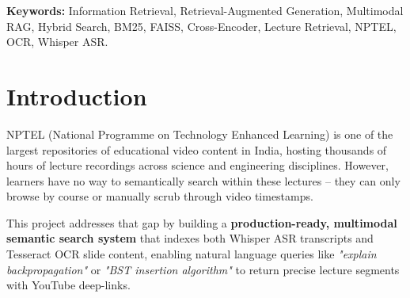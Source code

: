 \documentclass[12pt,a4paper]{article}
\begin{document}
\begin{abstract}
We present \textbf{VidyaRAG}, a multimodal semantic search system over NPTEL lecture transcripts and slide content. The system combines dense retrieval using BGE-large-en-v1.5 embeddings with BM25 sparse retrieval, fused via Reciprocal Rank Fusion (RRF), and reranked using a cross-encoder. A novel slide-boundary chunking strategy (C3) is introduced that detects lecture slide transitions using OCR Jaccard similarity between consecutive segments. Evaluated on 84 human-annotated queries across 9 CS disciplines, the full system achieves MRR\,=\,0.8259 and Recall@10\,=\,0.9643, representing an \textbf{84.4\%} improvement over the fixed-window baseline in MRR. A rigorous 9-experiment ablation study isolates the contributions of OCR fusion, BM25 hybrid retrieval, and chunking strategy. The system is deployed as a live Streamlit application on Hugging Face Spaces with YouTube deep-link results.
\end{abstract}

\vspace{0.3cm}
\noindent\textbf{Keywords:} Information Retrieval, Retrieval-Augmented Generation, Multimodal RAG, Hybrid Search, BM25, FAISS, Cross-Encoder, Lecture Retrieval, NPTEL, OCR, Whisper ASR.

\newpage

\section{Introduction}

NPTEL (National Programme on Technology Enhanced Learning) is one of the largest repositories of educational video content in India, hosting thousands of hours of lecture recordings across science and engineering disciplines. However, learners have no way to semantically search within these lectures -- they can only browse by course or manually scrub through video timestamps.

This project addresses that gap by building a \textbf{production-ready, multimodal semantic search system} that indexes both Whisper ASR transcripts and Tesseract OCR slide content, enabling natural language queries like \emph{"explain backpropagation"} or \emph{"BST insertion algorithm"} to return precise lecture segments with YouTube deep-links.
\end{document}
